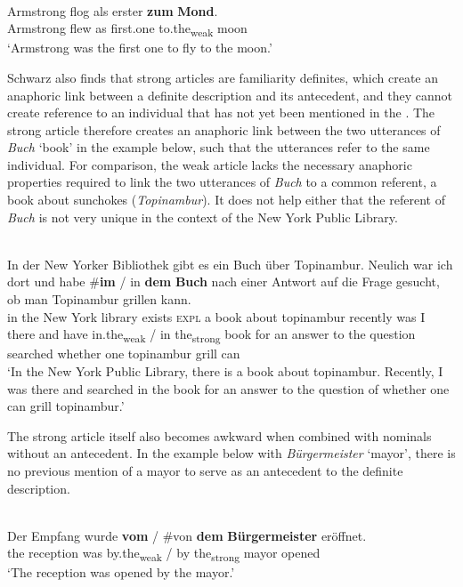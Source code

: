 \documentclass[output=paper,modfonts,nonflat]{langsci/langscibook}
\begin{document}
\ea \label{ex:cisneros:9}
 \\
\gll
Armstrong flog als erster \textbf{zum} \textbf{Mond}.\\
Armstrong flew as first.one to.the\textsubscript{weak} moon\\
\glt
`Armstrong was the first one to fly to the moon.'
\z 

Schwarz also finds that strong articles are familiarity definites, which create an anaphoric link between a definite description and its antecedent, and they cannot create reference to an individual that has not yet been mentioned in the .  The strong article therefore creates an anaphoric link between the two utterances of \textit{Buch} `book' in the example below, such that the utterances refer to the same individual.  For comparison, the weak article lacks the necessary anaphoric properties required to link the two utterances of \textit{Buch} to a common referent, a book about sunchokes (\textit{Topinambur}). It does not help either that the referent of \textit{Buch} is not very unique in the context of the New York Public Library.

\ea \label{ex:cisneros:10}
 \\
\gll
In der New Yorker Bibliothek gibt es ein Buch \"uber Topinambur.  Neulich war ich dort und habe \textnormal{\#}\textbf{im} \textnormal{/} in \textbf{dem} \textbf{Buch} nach einer Antwort auf die Frage gesucht, ob man Topinambur grillen kann.\\
in the New York library exists \textsc{expl} a book about topinambur recently was I there and have \phantom{\#}in.the\textsubscript{weak} / in the\textsubscript{strong} book for an answer to the question searched whether one topinambur grill can\\
\glt
`In the New York Public Library, there is a book about topinambur.  Recently, I was there and searched in the book for an answer to the question of whether one can grill topinambur.'
\z \largerpage[2]

The strong article itself also becomes awkward when combined with nominals without an antecedent.  In the example below with \textit{B\"urgermeister} `mayor', there is no previous mention of a mayor to serve as an antecedent to the definite description.

\ea \label{ex:cisneros:11}
 \\
\gll
Der Empfang wurde \textbf{vom} \textnormal{/} \textnormal{\#}von \textbf{dem} \textbf{B\"urgermeister} er\"offnet.\\
the reception was by.the\textsubscript{weak} / \phantom{\#}by the\textsubscript{strong} mayor opened\\
\glt
`The reception was opened by the mayor.'
\z 
\end{document}
